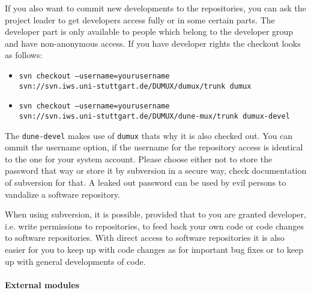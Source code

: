 If you also want to commit new developments to the repositories, you can ask the \Dumux project leader to get developers access fully or in some certain parts. The developer part is only available to people which belong to the \Dumux developer group and have non-anonymous access. If you have developer rights the checkout looks as follows: 
\begin{itemize}
 \item \texttt{svn checkout --username=yourusername \\ 
      \hspace{4cm} svn://svn.iws.uni-stuttgart.de/DUMUX/dumux/trunk dumux}
 \item \texttt{svn checkout --username=yourusername \\
      \hspace{4cm} svn://svn.iws.uni-stuttgart.de/DUMUX/dune-mux/trunk dumux-devel}
\end{itemize} 
The \texttt{dune-devel} makes use of \texttt{dumux} thats why it is also checked out. You can ommit the username option, if the username for the repository access is identical to the one for your system account. Please choose either not to store the password that way or store it by subversion in a secure way, check documentation of subversion for that. A leaked out password can be used by evil persons to vandalize a software repository.

When using subversion, it is possible, provided that to you are granted developer, i.e. write permissions to repositories, to feed back
your own code or code changes to software repositories. With direct access to software repositories it is also easier for you to keep up with code changes as for important bug fixes or to keep up with general developments of code.


\paragraph{External modules}
%


